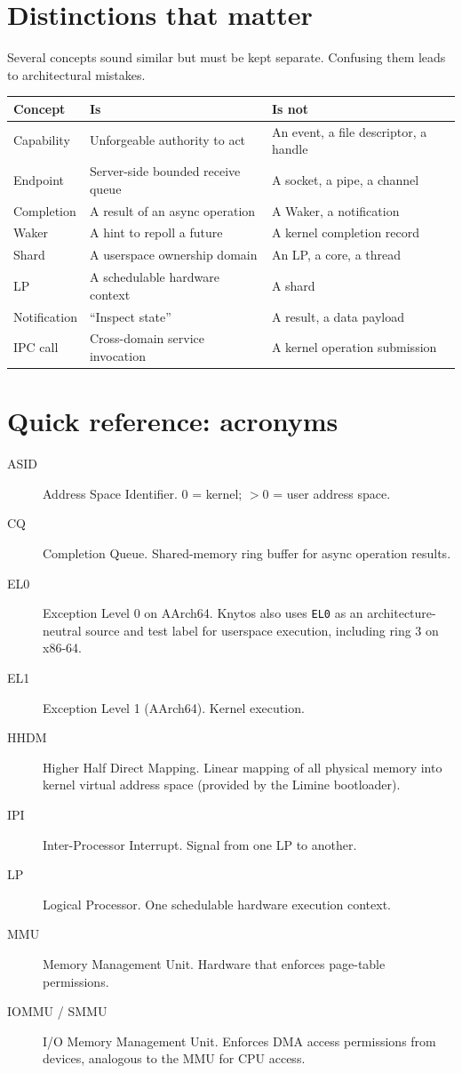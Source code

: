 \section{Distinctions that matter}

Several concepts sound similar but must be kept separate. Confusing them leads to
architectural mistakes.

\begin{center}
\begin{tabular}{|l|l|l|}
\hline
\textbf{Concept} & \textbf{Is} & \textbf{Is not} \\
\hline
Capability & Unforgeable authority to act & An event, a file descriptor, a handle \\
Endpoint & Server-side bounded receive queue & A socket, a pipe, a channel \\
Completion & A result of an async operation & A Waker, a notification \\
Waker & A hint to repoll a future & A kernel completion record \\
Shard & A userspace ownership domain & An LP, a core, a thread \\
LP & A schedulable hardware context & A shard \\
Notification & ``Inspect state'' & A result, a data payload \\
IPC call & Cross-domain service invocation & A kernel operation submission \\
\hline
\end{tabular}
\end{center}

\section{Quick reference: acronyms}

\begin{description}
    \item[ASID] Address Space Identifier. 0 = kernel; $>$0 = user address space.
    \item[CQ] Completion Queue. Shared-memory ring buffer for async operation
        results.
    \item[EL0] Exception Level 0 on AArch64. Knytos also uses
        \texttt{EL0} as an architecture-neutral source and test label for
        userspace execution, including ring 3 on x86-64.
    \item[EL1] Exception Level 1 (AArch64). Kernel execution.
    \item[HHDM] Higher Half Direct Mapping. Linear mapping of all physical memory
        into kernel virtual address space (provided by the Limine bootloader).
    \item[IPI] Inter-Processor Interrupt. Signal from one LP to another.
    \item[LP] Logical Processor. One schedulable hardware execution context.
    \item[MMU] Memory Management Unit. Hardware that enforces page-table
        permissions.
    \item[IOMMU / SMMU] I/O Memory Management Unit. Enforces DMA access
        permissions from devices, analogous to the MMU for CPU access.
\end{description}

\endinput
